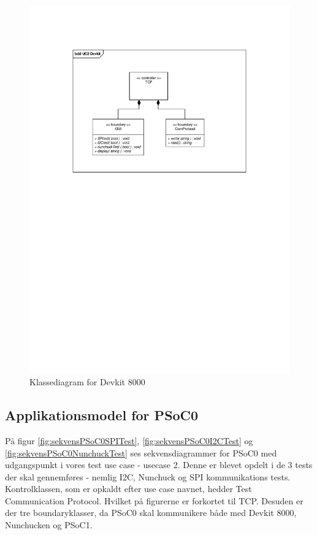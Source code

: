 \begin{figure}[H]
	\centering
	\includegraphics[trim = {3.2cm 16.1cm 3.2cm 3.5cm}, clip = true, width=\textwidth] {Systemarkitektur/images/klassediagramDevkit.pdf}
	\caption{Klassediagram for Devkit 8000}
	\label{fig:klasseDevkit}
\end{figure}

\subsection{Applikationsmodel for PSoC0}
På figur \ref{fig:sekvensPSoC0SPITest}, \ref{fig:sekvensPSoC0I2CTest} og \ref{fig:sekvensPSoC0NunchuckTest} ses sekvensdiagrammer for PSoC0 med udgangspunkt i vores test use case - usecase 2. Denne er blevet opdelt i de 3 tests der skal gennemføres - nemlig I2C, Nunchuck og SPI kommunikations tests. Kontrolklassen, som er opkaldt efter use case navnet, hedder Test Communication Protocol. Hvilket på figurerne er forkortet til TCP. Desuden er der tre boundaryklasser, da PSoC0 skal kommunikere både med Devkit 8000, Nunchucken og PSoC1.

